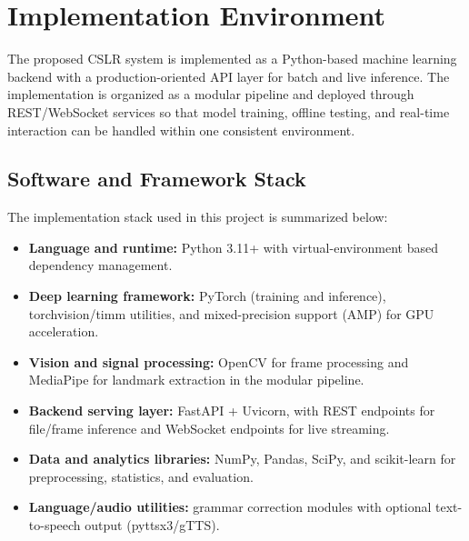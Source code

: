 \section{Implementation Environment}
The proposed CSLR system is implemented as a Python-based machine learning backend with a production-oriented API layer for batch and live inference. The implementation is organized as a modular pipeline and deployed through REST/WebSocket services so that model training, offline testing, and real-time interaction can be handled within one consistent environment.

\subsection{Software and Framework Stack}
The implementation stack used in this project is summarized below:
\begin{itemize}[leftmargin=1.5em]
\item \textbf{Language and runtime:} Python 3.11+ with virtual-environment based dependency management.
\item \textbf{Deep learning framework:} PyTorch (training and inference), torchvision/timm utilities, and mixed-precision support (AMP) for GPU acceleration.
\item \textbf{Vision and signal processing:} OpenCV for frame processing and MediaPipe for landmark extraction in the modular pipeline.
\item \textbf{Backend serving layer:} FastAPI + Uvicorn, with REST endpoints for file/frame inference and WebSocket endpoints for live streaming.
\item \textbf{Data and analytics libraries:} NumPy, Pandas, SciPy, and scikit-learn for preprocessing, statistics, and evaluation.
\item \textbf{Language/audio utilities:} grammar correction modules with optional text-to-speech output (pyttsx3/gTTS).
\end{itemize}

